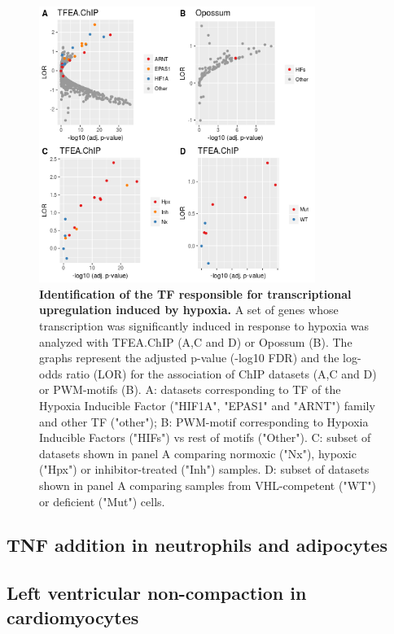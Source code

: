 \documentclass[10pt,letterpaper]{article}
\begin{document}
		\begin{figure}[h]
			\centering
			\includegraphics[width=0.8\textwidth]{fig_Hx}
			\caption{{\bf Identification of the TF responsible for transcriptional upregulation induced by hypoxia.} A set of genes whose transcription was significantly induced in response to hypoxia was analyzed with TFEA.ChIP (A,C and D) or Opossum (B). The graphs represent the adjusted p-value (-log10 FDR) and the log-odds ratio (LOR) for the association of ChIP datasets (A,C and D) or PWM-motifs (B). A: datasets corresponding to TF of the Hypoxia Inducible Factor ("HIF1A", "EPAS1" and "ARNT") family and other TF ("other"); B: PWM-motif corresponding to Hypoxia Inducible Factors ("HIFs") vs rest of motifs ("Other"). C: subset of datasets shown in panel A comparing normoxic ("Nx"), hypoxic ("Hpx") or inhibitor-treated ("Inh") samples. D: subset of datasets shown in panel A comparing samples from VHL-competent ("WT") or deficient ("Mut") cells.}
			\label{fig_Hx}
		\end{figure}
		
	\subsection{TNF addition in neutrophils and adipocytes}
	
	\subsection{Left ventricular non-compaction in cardiomyocytes}
	
\end{document}
